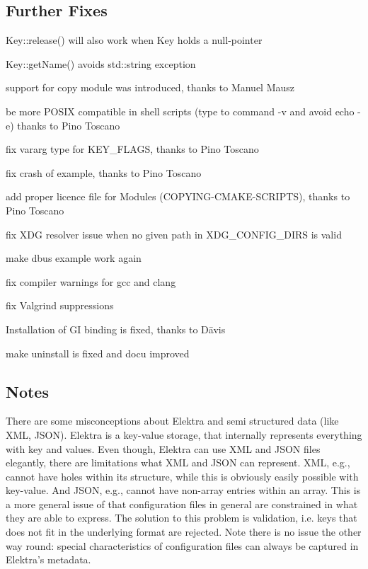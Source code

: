 \subsection*{Further Fixes}


\begin{DoxyItemize}
\item Key\+::release() will also work when Key holds a null-\/pointer
\item Key\+::get\+Name() avoids std\+::string exception
\item support for copy module was introduced, thanks to Manuel Mausz
\item be more P\+O\+S\+IX compatible in shell scripts ({\ttfamily type} to {\ttfamily command -\/v} and avoid {\ttfamily echo -\/e}) thanks to Pino Toscano
\item fix vararg type for K\+E\+Y\+\_\+\+F\+L\+A\+GS, thanks to Pino Toscano
\item fix crash of example, thanks to Pino Toscano
\item add proper licence file for Modules (C\+O\+P\+Y\+I\+N\+G-\/\+C\+M\+A\+K\+E-\/\+S\+C\+R\+I\+P\+TS), thanks to Pino Toscano
\item fix X\+DG resolver issue when no given path in X\+D\+G\+\_\+\+C\+O\+N\+F\+I\+G\+\_\+\+D\+I\+RS is valid
\item make dbus example work again
\item fix compiler warnings for gcc and clang
\item fix Valgrind suppressions
\item Installation of GI binding is fixed, thanks to Dāvis
\item make uninstall is fixed and docu improved
\end{DoxyItemize}

\subsection*{Notes}

There are some misconceptions about Elektra and semi structured data (like X\+ML, J\+S\+ON). Elektra is a key-\/value storage, that internally represents everything with key and values. Even though, Elektra can use X\+ML and J\+S\+ON files elegantly, there are limitations what X\+ML and J\+S\+ON can represent. X\+ML, e.\+g., cannot have holes within its structure, while this is obviously easily possible with key-\/value. And J\+S\+ON, e.\+g., cannot have non-\/array entries within an array. This is a more general issue of that configuration files in general are constrained in what they are able to express. The solution to this problem is validation, i.\+e. keys that does not fit in the underlying format are rejected. Note there is no issue the other way round\+: special characteristics of configuration files can always be captured in Elektra’s metadata.

